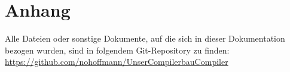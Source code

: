 \section{Anhang}
Alle Dateien oder sonstige Dokumente, auf die sich in dieser Dokumentation bezogen wurden, sind in folgendem Git-Repository zu finden: \\
\href{https://github.com/nohoffmann/UnserCompilerbauCompiler}{https://github.com/nohoffmann/UnserCompilerbauCompiler}